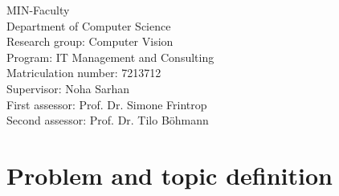 \documentclass[11pt,a4paper]{scrbook}
\begin{document}
\begin{titlepage}
\noindent
MIN-Faculty \vspace*{0.25cm} \\
Department of Computer Science\vspace*{0.25cm} \\
Research group: Computer Vision\vspace*{0.25cm} \\
Program: IT Management and Consulting\vspace*{0.25cm} \\
Matriculation number: 7213712 \vspace*{0.5cm} \\
Supervisor: Noha Sarhan \vspace*{0.25cm} \\
First assessor: Prof. Dr. Simone Frintrop \vspace*{0.25cm} \\
Second assessor: Prof. Dr. Tilo Böhmann

\end{titlepage}

\restoregeometry

\tableofcontents

\mainmatter
\setlength{\parindent}{1cm}


\chapter{Problem and topic definition}

\end{document}
